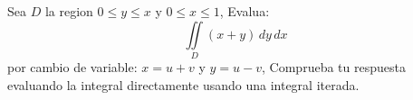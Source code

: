 \noindent Sea $D$ la region $0 \leq y \leq x$ y $0 \leq x \leq 1$,  Evalua:
\[\displaystyle\iint\limits_D (x+y) \, dy \, dx\]
\noindent por cambio de variable: $x = u+v$ y $y = u-v$, Comprueba tu respuesta evaluando la integral
directamente usando una integral iterada.
\vspace{12pt}
